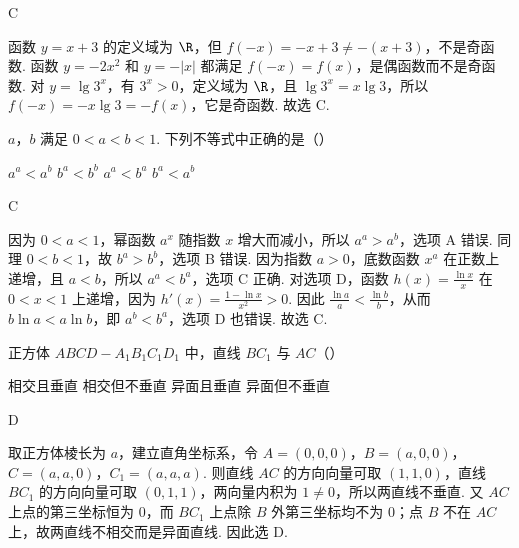 \documentclass[UTF8,a4paper,oneside,11pt]{ctexbook}
\begin{document}
\begin{answer}
C
\end{answer}

\begin{solution}
函数 \(y=x+3\) 的定义域为 \(\R\)，但 \(f(-x)=-x+3\neq-(x+3)\)，不是奇函数. 函数 \(y=-2x^2\) 和 \(y=-|x|\) 都满足 \(f(-x)=f(x)\)，是偶函数而不是奇函数. 对 \(y=\lg 3^x\)，有 \(3^x>0\)，定义域为 \(\R\)，且 \(\lg 3^x=x\lg3\)，所以 \(f(-x)=-x\lg3=-f(x)\)，它是奇函数. 故选 C.
\end{solution}

\begin{problem}

\(a\)，\(b\) 满足 \(0 < a < b < 1\). 下列不等式中正确的是（\quad）

\choices
    {\(a^a < a^b\)}
    {\(b^a < b^b\)}
    {\(a^a < b^a\)}
    {\(b^a < a^b\)}
\end{problem}

\begin{answer}
C
\end{answer}

\begin{solution}
因为 \(0<a<1\)，幂函数 \(a^x\) 随指数 \(x\) 增大而减小，所以 \(a^a>a^b\)，选项 A 错误. 同理 \(0<b<1\)，故 \(b^a>b^b\)，选项 B 错误. 因为指数 \(a>0\)，底数函数 \(x^a\) 在正数上递增，且 \(a<b\)，所以 \(a^a<b^a\)，选项 C 正确. 对选项 D，函数 \(h(x)=\frac{\ln x}{x}\) 在 \(0<x<1\) 上递增，因为 \(h'(x)=\frac{1-\ln x}{x^2}>0\). 因此 \(\frac{\ln a}{a}<\frac{\ln b}{b}\)，从而 \(b\ln a<a\ln b\)，即 \(a^b<b^a\)，选项 D 也错误. 故选 C.
\end{solution}

\begin{problem}

正方体 \(ABCD - A_{1}B_{1}C_{1}D_{1}\) 中，直线 \(BC_{1}\) 与 \(AC\)（\quad）

\choices
    {相交且垂直}
    {相交但不垂直}
    {异面且垂直}
    {异面但不垂直}
\end{problem}

\begin{answer}
D
\end{answer}

\begin{solution}
取正方体棱长为 \(a\)，建立直角坐标系，令 \(A=(0,0,0)\)，\(B=(a,0,0)\)，\(C=(a,a,0)\)，\(C_1=(a,a,a)\). 则直线 \(AC\) 的方向向量可取 \((1,1,0)\)，直线 \(BC_1\) 的方向向量可取 \((0,1,1)\)，两向量内积为 \(1\neq0\)，所以两直线不垂直. 又 \(AC\) 上点的第三坐标恒为 \(0\)，而 \(BC_1\) 上点除 \(B\) 外第三坐标均不为 \(0\)；点 \(B\) 不在 \(AC\) 上，故两直线不相交而是异面直线. 因此选 D.
\end{solution}
\end{document}
